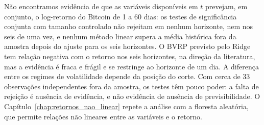Não encontramos evidência de que as variáveis disponíveis em $t$ prevejam, em
conjunto, o log-retorno do Bitcoin de 1 a 60 dias: os testes de significância conjunta com tamanho
controlado não rejeitam em nenhum horizonte, nem nos seis de uma vez, e
nenhum método linear supera a média histórica fora da amostra depois do
ajuste para os seis horizontes. O BVRP previsto pelo Ridge tem relação
negativa com o retorno nos seis horizontes, na direção da literatura, mas a
evidência é fraca e frágil e se restringe ao horizonte de um dia. A diferença
entre os regimes de volatilidade depende da posição do corte. Com cerca de 33
observações independentes fora da amostra, os testes têm pouco poder: a falta
de rejeição é ausência de evidência, e não evidência de ausência de
previsibilidade. O Capítulo~\ref{chap:retornos_nao_linear} repete a análise com
a floresta aleatória, que permite relações não lineares entre as variáveis e
o retorno.

